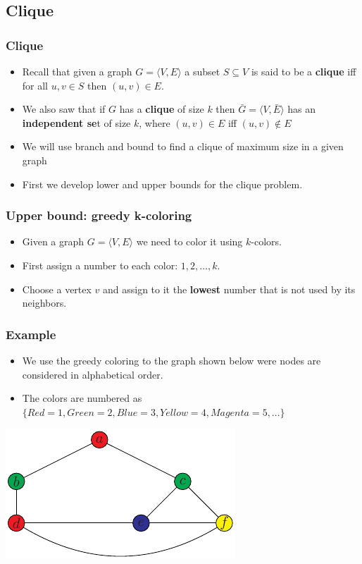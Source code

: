 \documentclass{beamer}
\begin{document}
\subsection{Clique}


\begin{frame}
  \frametitle{Clique}
  \begin{itemize}
  \item Recall that given a graph $G=\langle V,E\rangle$ a subset $S\subseteq V$ is said to be a \textbf{clique} iff for all $u,v\in S$ then $(u,v)\in E$.
\item We also saw that if $G$ has a \textbf{clique} of size $k$ then $\bar{G}=\langle V,\bar{E}\rangle$ has an \textbf{independent se}t of size $k$, where $(u,v)\in E$ iff $(u,v)\notin E$
\item We will use branch and bound to find a clique of maximum size in a given graph
\item First we develop  lower and upper bounds for the clique problem.
  \end{itemize}
\end{frame}
\begin{frame}
  \frametitle{Upper bound: greedy k-coloring}
  \begin{itemize}
  \item Given a graph $G=\langle V,E\rangle$ we need to color it using $k$-colors.
  \item First assign a number to each color: $1,2,\ldots,k$.
  \item Choose a vertex $v$ and assign to it the \textbf{lowest} number that is not used by its neighbors.
  \end{itemize}
\end{frame}
\begin{frame}
   \frametitle{Example}
  \begin{itemize}
  \item We use the greedy coloring to the graph shown below were nodes are considered in alphabetical order.
  \item The colors are numbered as $\{Red=1,Green=2,Blue=3,Yellow=4,Magenta=5,\ldots\}$
  \end{itemize}
  \begin{center}
    \includegraphics{coping-figs/greedy-kcolor-not-always}
  \end{center}
\end{frame}
\end{document}

